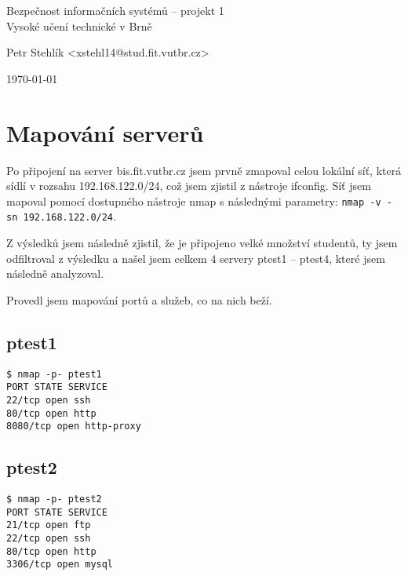 \documentclass[11pt,a4paper]{article}
\begin{document}
\begin{center}
	\LARGE{Bezpečnost informačních systémů -- projekt 1}\\
	\large{Vysoké učení technické v Brně}
	\vspace{0.5cm}

	Petr Stehlík <xstehl14@stud.fit.vutbr.cz>

	\vspace{0.2cm}

	\today

\end{center}

\section{Mapování serverů}

Po připojení na server bis.fit.vutbr.cz jsem prvně zmapoval celou lokální síť, která sídlí v rozsahu 192.168.122.0/24, což jsem zjistil z nástroje ifconfig. Síť jsem mapoval pomocí dostupného nástroje nmap s následnými parametry: \texttt{nmap -v -sn 192.168.122.0/24}.

Z výsledků jsem následně zjistil, že je připojeno velké množství studentů, ty jsem odfiltroval z výsledku a našel jsem celkem 4 servery ptest1 -- ptest4, které jsem následně analyzoval.

Provedl jsem mapování portů a služeb, co na nich beží.

\subsection{ptest1}

\texttt{\$ nmap -p- ptest1\\
PORT     STATE SERVICE\\
22/tcp   open  ssh\\
80/tcp   open  http\\
8080/tcp open  http-proxy\\
}

\subsection{ptest2}
\texttt{\$ nmap -p- ptest2\\
PORT     STATE SERVICE\\
21/tcp   open  ftp\\
22/tcp   open  ssh\\
80/tcp   open  http\\
3306/tcp open  mysql\\
}
\end{document}
